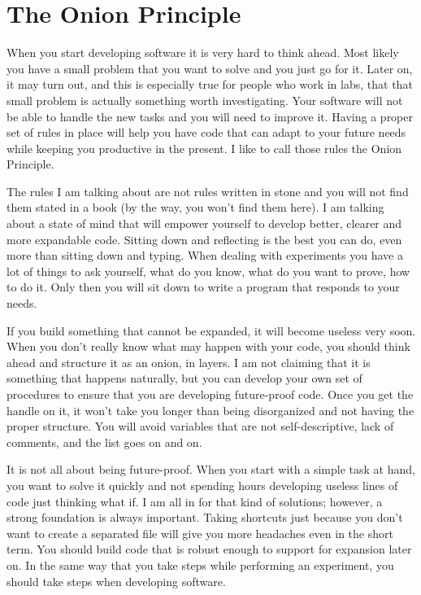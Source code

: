 \section{The Onion Principle}\label{section:onion-principle}
When you start developing software it is very hard to think ahead. Most likely you have a small problem that you want to solve and you just go for it. Later on, it may turn out, and this is especially true for people who work in labs, that that small problem is actually something worth investigating. Your software will not be able to handle the new tasks and you will need to improve it. Having a proper set of rules in place will help you have code that can adapt to your future needs while keeping you productive in the present. I like to call those rules the Onion Principle.

The rules I am talking about are not rules written in stone and you will not find them stated in a book (by the way, you won’t find them here). I am talking about a state of mind that will empower yourself to develop better, clearer and more expandable code. Sitting down and reflecting is the best you can do, even more than sitting down and typing. When dealing with experiments you have a lot of things to ask yourself, what do you know, what do you want to prove, how to do it. Only then you will sit down to write a program that responds to your needs.

If you build something that cannot be expanded, it will become useless very soon. When you don’t really know what may happen with your code, you should think ahead and structure it as an onion, in layers. I am not claiming that it is something that happens naturally, but you can develop your own set of procedures to ensure that you are developing future-proof code. Once you get the handle on it, it won’t take you longer than being disorganized and not having the proper structure. You will avoid variables that are not self-descriptive, lack of comments, and the list goes on and on.

It is not all about being future-proof. When you start with a simple task at hand, you want to solve it quickly and not spending hours developing useless lines of code just thinking what if. I am all in for that kind of solutions; however, a strong foundation is always important. Taking shortcuts just because you don’t want to create a separated file will give you more headaches even in the short term. You should build code that is robust enough to support for expansion later on. In the same way that you take steps while performing an experiment, you should take steps when developing software.

